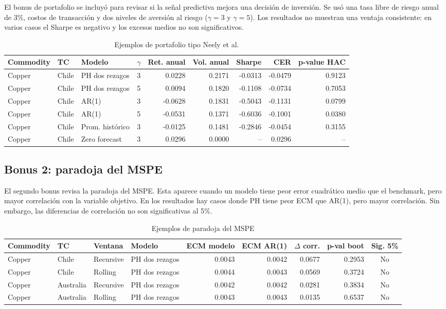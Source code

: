 \documentclass[11pt,letterpaper]{article}
\begin{document}
El bonus de portafolio se incluyó para revisar si la señal predictiva mejora una decisión de inversión. Se usó una tasa libre de riesgo anual de 3\%, costos de transacción y dos niveles de aversión al riesgo ($\gamma=3$ y $\gamma=5$). Los resultados no muestran una ventaja consistente: en varios casos el Sharpe es negativo y los excesos medios no son significativos.

\begin{table}[H]
\centering
\caption{Ejemplos de portafolio tipo Neely et al.}
\scriptsize
\begin{tabular}{llllrrrrr}
\toprule
Commodity & TC & Modelo & $\gamma$ & Ret. anual & Vol. anual & Sharpe & CER & p-value HAC \\
\midrule
Copper & Chile & PH dos rezagos & 3 & 0.0228 & 0.2171 & -0.0313 & -0.0479 & 0.9123 \\
Copper & Chile & PH dos rezagos & 5 & 0.0094 & 0.1820 & -0.1108 & -0.0734 & 0.7053 \\
Copper & Chile & AR(1) & 3 & -0.0628 & 0.1831 & -0.5043 & -0.1131 & 0.0799 \\
Copper & Chile & AR(1) & 5 & -0.0531 & 0.1371 & -0.6036 & -0.1001 & 0.0380 \\
Copper & Chile & Prom. histórico & 3 & -0.0125 & 0.1481 & -0.2846 & -0.0454 & 0.3155 \\
Copper & Chile & Zero forecast & 3 & 0.0296 & 0.0000 & -- & 0.0296 & -- \\
\bottomrule
\end{tabular}
\end{table}

\subsection{Bonus 2: paradoja del MSPE}

El segundo bonus revisa la paradoja del MSPE. Esta aparece cuando un modelo tiene peor error cuadrático medio que el benchmark, pero mayor correlación con la variable objetivo. En los resultados hay casos donde PH tiene peor ECM que AR(1), pero mayor correlación. Sin embargo, las diferencias de correlación no son significativas al 5\%.

\begin{table}[H]
\centering
\caption{Ejemplos de paradoja del MSPE}
\scriptsize
\begin{tabular}{llllrrrrc}
\toprule
Commodity & TC & Ventana & Modelo & ECM modelo & ECM AR(1) & $\Delta$ corr. & p-val boot & Sig. 5\% \\
\midrule
Copper & Chile & Recursive & PH dos rezagos & 0.0043 & 0.0042 & 0.0677 & 0.2953 & No \\
Copper & Chile & Rolling & PH dos rezagos & 0.0044 & 0.0043 & 0.0569 & 0.3724 & No \\
Copper & Australia & Recursive & PH dos rezagos & 0.0042 & 0.0042 & 0.0281 & 0.3834 & No \\
Copper & Australia & Rolling & PH dos rezagos & 0.0043 & 0.0043 & 0.0135 & 0.6537 & No \\
\bottomrule
\end{tabular}
\end{table}
\end{document}
